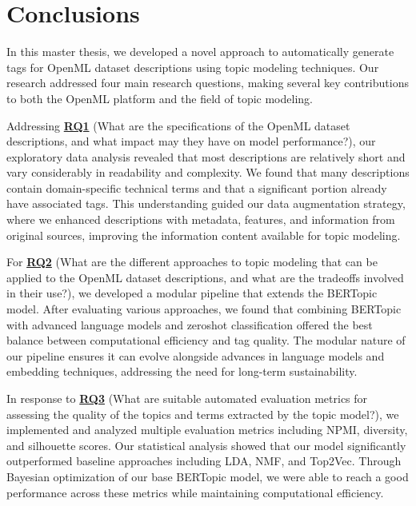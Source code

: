 \section{Conclusions}
In this master thesis, we developed a novel approach to automatically generate tags for OpenML dataset descriptions using topic modeling techniques. Our research addressed four main research questions, making several key contributions to both the OpenML platform and the field of topic modeling.

Addressing \hyperref[rq1]{\textbf{RQ1}} (What are the specifications of the OpenML dataset descriptions, and what impact may they have on model performance?), our exploratory data analysis revealed that most descriptions are relatively short and vary considerably in readability and complexity. We found that many descriptions contain domain-specific technical terms and that a significant portion already have associated tags. This understanding guided our data augmentation strategy, where we enhanced descriptions with metadata, features, and information from original sources, improving the information content available for topic modeling.

For \hyperref[rq2]{\textbf{RQ2}} (What are the different approaches to topic modeling that can be applied to the OpenML dataset descriptions, and what are the tradeoffs involved in their use?), we developed a modular pipeline that extends the BERTopic model. After evaluating various approaches, we found that combining BERTopic with advanced language models and zeroshot classification offered the best balance between computational efficiency and tag quality. The modular nature of our pipeline ensures it can evolve alongside advances in language models and embedding techniques, addressing the need for long-term sustainability.

In response to \hyperref[rq3]{\textbf{RQ3}} (What are suitable automated evaluation metrics for assessing the quality of the topics and terms extracted by the topic model?), we implemented and analyzed multiple evaluation metrics including NPMI, diversity, and silhouette scores. Our statistical analysis showed that our model significantly outperformed baseline approaches including LDA, NMF, and Top2Vec. Through Bayesian optimization of our base BERTopic model, we were able to reach a good performance across these metrics while maintaining computational efficiency.

